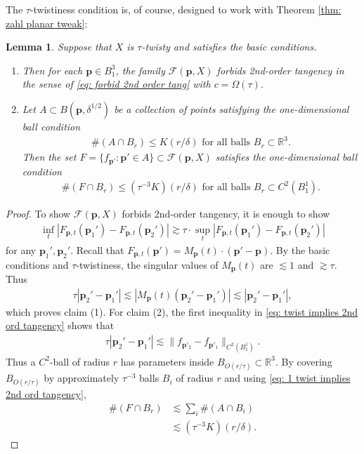 \documentclass[12pt]{amsart}
\numberwithin{equation}{section}
\newtheorem{lemma}{Lemma}[section]
\newcommand{\R}{\mathbb{R}}
\newcommand{\1}{\mathbbm{1}}
\newcommand{\p}{\mathbf p}
\begin{document}
The $\tau$-twistiness condition is, of course, designed to work with Theorem \ref{thm: zahl planar tweak}:

\begin{lemma}\label{lem: twist implies 2nd ord tangency}
    Suppose that $X$ is $\tau$-twisty and satisfies the basic conditions.
    \begin{enumerate}
        \item Then for each $\p \in B_1^3$, the family $\mathcal F(\p, X)$ forbids 2nd-order tangency in the sense of \eqref{eq: forbid 2nd order tang} with $c = \Omega(\tau)$.
        \item Let $A \subset B(\p, \delta^{1/2})$ be a collection of points satisfying the one-dimensional ball condition 
        \begin{align}\label{eq: 1 twist implies 2nd ord tangency}
            \#(A \cap B_r) \leq K(r/\delta) \text{ for all balls $B_r \subset \R^3$}.
        \end{align}
        Then the set $F = \{f_{\p'} : \p' \in A\} \subset \mathcal F(\p,X)$ satisfies the one-dimensional ball condition 
        \begin{align}
            \#(F \cap B_r) \leq (\tau^{-3}K) (r/\delta) \text{ for all balls $B_r \subset C^2(B_1^1)$.}
        \end{align}
    \end{enumerate}
\end{lemma}

\begin{proof}
    To show $\mathcal F(\p,X)$ forbids 2nd-order tangency, it is enough to show 
    \begin{align}
        \inf_t |F_{\p,t}(\p_1') - F_{\p,t}(\p_2')| \gtrsim \tau \cdot \sup_t |F_{\p,t}(\p_1') - F_{\p,t}(\p_2')|
    \end{align}
    for any $\p_1',\p_2'$. Recall that $F_{\p,t}(\p') = M_\p(t) \cdot (\p'-\p)$. 
    By the basic conditions and $\tau$-twistiness, the singular values of $M_{\p}(t)$ are $\lesssim 1$ and $\gtrsim \tau$. Thus 
    \begin{align}\label{eq: twist implies 2nd ord tangency}
        \tau |\p_2' - \p_1'| \lesssim |M_\p(t) (\p_2'- \p_1')| \lesssim |\p_2' - \p_1'|,
    \end{align}
    which proves claim (1). 
    For claim (2), the first inequality in \eqref{eq: twist implies 2nd ord tangency} shows that 
    \begin{align}
        \tau |\p_2' - \p_1'| \lesssim \|f_{\p'_2} -f_{\p'_1}\|_{C^2(B_1^1)}.
    \end{align}
    Thus a $C^2$-ball of radius $r$ has parameters inside $B_{O(r/\tau)} \subset \R^3$. By covering $B_{O(r/\tau)}$ by approximately $\tau^{-3}$ balls $B_i$ of radius $r$ and using \eqref{eq: 1 twist implies 2nd ord tangency}, 
    \begin{align}
        \#(F \cap B_r) &\lesssim \sum_i \#(A \cap B_i) \\
        &\lesssim (\tau^{-3} K) (r/\delta).
    \end{align}
\end{proof}
\end{document}
